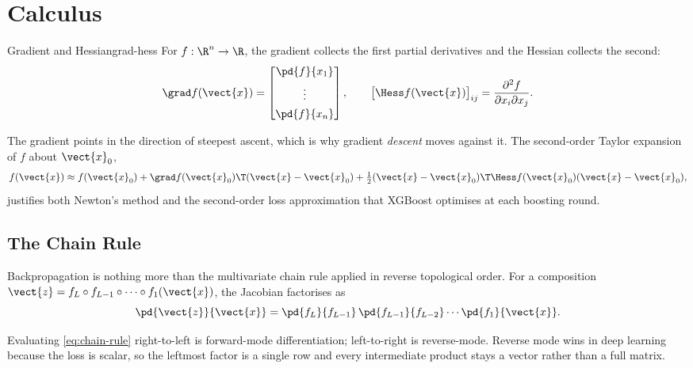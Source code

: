 \section{Calculus}
\label{sec:calculus}

\begin{definition}{Gradient and Hessian}{grad-hess}
    For $f : \R^{n} \to \R$, the gradient collects the first partial
    derivatives and the Hessian collects the second:
    \begin{equation*}
        \grad f(\vect{x}) =
        \begin{bmatrix} \pd{f}{x_1} \\[0.4em] \vdots \\[0.4em] \pd{f}{x_n} \end{bmatrix},
        \qquad
        \big[\Hess f(\vect{x})\big]_{ij} = \frac{\partial^2 f}{\partial x_i \partial x_j}.
    \end{equation*}
\end{definition}

The gradient points in the direction of steepest ascent, which is why gradient
\emph{descent} moves against it. The second-order Taylor expansion of $f$ about
$\vect{x}_0$,
%
\begin{equation}
    f(\vect{x}) \approx f(\vect{x}_0)
        + \grad f(\vect{x}_0)\T (\vect{x} - \vect{x}_0)
        + \tfrac{1}{2} (\vect{x} - \vect{x}_0)\T \Hess f(\vect{x}_0) (\vect{x} - \vect{x}_0),
    \label{eq:taylor}
\end{equation}
%
justifies both Newton's method and the second-order loss approximation that
XGBoost optimises at each boosting round.

\subsection{The Chain Rule}

Backpropagation is nothing more than the multivariate chain rule applied in
reverse topological order. For a composition
$\vect{z} = f_L \circ f_{L-1} \circ \dots \circ f_1(\vect{x})$, the Jacobian
factorises as
%
\begin{equation}
    \pd{\vect{z}}{\vect{x}}
        = \pd{f_L}{f_{L-1}} \, \pd{f_{L-1}}{f_{L-2}} \cdots \pd{f_1}{\vect{x}} .
    \label{eq:chain-rule}
\end{equation}

\begin{remark}
    Evaluating \cref{eq:chain-rule} right-to-left is forward-mode
    differentiation; left-to-right is reverse-mode. Reverse mode wins in deep
    learning because the loss is scalar, so the leftmost factor is a single row
    and every intermediate product stays a vector rather than a full matrix.
\end{remark}

